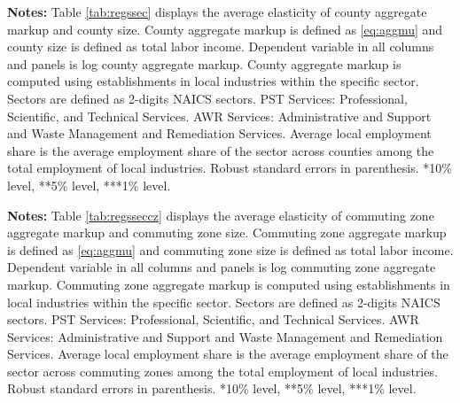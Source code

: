 \begin{landscape}
	\begin{table}[htbp]
		\centering
		\begin{threeparttable}
			\caption{County Aggregate markup and County Size Regressions by Sector}
			\vspace{-0.3cm}
			\label{tab:regssec}%
			\begin{tablenotes}
				\item \footnotesize{\textbf{Notes:} Table \ref{tab:regssec} displays the average elasticity of county aggregate markup and county size. County aggregate markup is defined as \eqref{eq:aggmu} and county size is defined as total labor income. Dependent variable in all columns and panels is log county aggregate markup. County aggregate markup is computed using establishments in local industries within the specific sector. Sectors are defined as 2-digits NAICS sectors. PST Services: Professional, Scientific, and Technical Services. AWR Services: Administrative and Support and Waste Management and Remediation Services. Average local employment share is the average employment share of the sector across counties among the total employment of local industries. Robust standard errors in parenthesis. *10\% level, **5\% level, ***1\% level.
				}
			\end{tablenotes}
		\end{threeparttable}
	\end{table}%
\end{landscape}

\begin{landscape}
	\begin{table}[htbp]
		\centering
		\begin{threeparttable}
			\caption{Commuting Zone Aggregate Markup and Commuting Zone Size Regressions by Sector}
			\vspace{-0.3cm}
			\label{tab:regsseccz}%
			\begin{tablenotes}
				\item \footnotesize{\textbf{Notes:} Table \ref{tab:regsseccz} displays the average elasticity of commuting zone aggregate markup and commuting zone size. Commuting zone aggregate markup is defined as \eqref{eq:aggmu} and commuting zone size is defined as total labor income. Dependent variable in all columns and panels is log commuting zone aggregate markup. Commuting zone aggregate markup is computed using establishments in local industries within the specific sector. Sectors are defined as 2-digits NAICS sectors. PST Services: Professional, Scientific, and Technical Services. AWR Services: Administrative and Support and Waste Management and Remediation Services. Average local employment share is the average employment share of the sector across commuting zones among the total employment of local industries. Robust standard errors in parenthesis. *10\% level, **5\% level, ***1\% level.
				}
			\end{tablenotes}
		\end{threeparttable}
	\end{table}%
\end{landscape}


